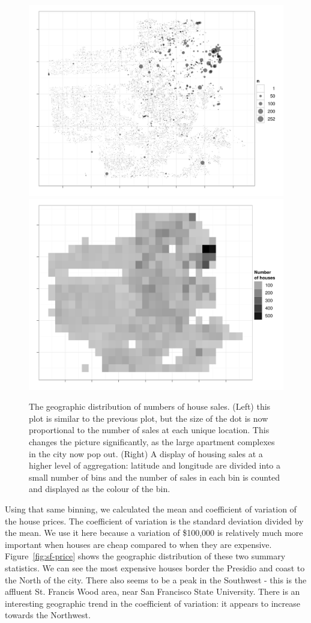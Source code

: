 \documentclass[oneside]{article}
\begin{document}
\begin{figure}[htbp]
  \centering
    \includegraphics[width=0.5\linewidth]{sf-geo-n}%
    \includegraphics[width=0.5\linewidth]{sf-bin-n}
  \caption{The geographic distribution of numbers of house sales.  (Left) this plot is similar to the previous plot, but the size of the dot is now proportional to the number of sales at each unique location.  This changes the picture significantly, as the large apartment complexes in the city now pop out.  (Right) A display of housing sales at a higher level of aggregation: latitude and longitude are divided into a small number of bins and the number of sales in each bin is counted and displayed as the colour of the bin.}
  \label{fig:sf-n}
\end{figure}

Using that same binning, we calculated the mean and coefficient of variation of the house prices.  The coefficient of variation is the standard deviation divided by the mean.  We use it here because a variation of \$100,000 is relatively much more important when houses are cheap compared to when they are expensive.  Figure~\ref{fig:sf-price} shows the geographic distribution of these two summary statistics.   We can see the most expensive houses border the Presidio and coast to the North of the city.  There also seems to be a peak in the Southwest - this is the affluent St. Francis Wood area, near San Francisco State University.  There is an interesting geographic trend in the coefficient of variation: it appears to increase towards the Northwest.  
\end{document}
